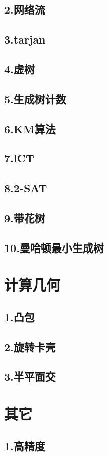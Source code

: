 \documentclass[UTF8,a4paper]{ctexart}
\begin{document}
\subsection{2.网络流}

\subsection{3.tarjan}

\subsection{4.虚树}

\subsection{5.生成树计数}

\subsection{6.KM算法}

\subsection{7.lCT}

\subsection{8.2-SAT}

\subsection{9.带花树}

\subsection{10.曼哈顿最小生成树}

\section{计算几何}

\subsection{1.凸包}

\subsection{2.旋转卡壳}

\subsection{3.半平面交}

\section{其它}

\subsection{1.高精度}

\maketitle 
\end{document}
